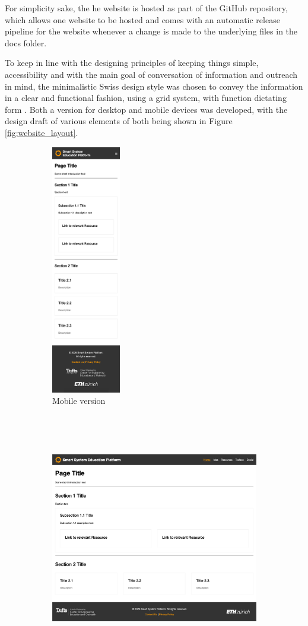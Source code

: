 For simplicity sake, the he website is hosted as part of the GitHub repository, which allows one website to be hosted and comes with an automatic release pipeline for the website whenever a change is made to the underlying files in the docs folder.

To keep in line with the designing principles of keeping things simple, accessibility and with the main goal of conversation of information and outreach in mind, the minimalistic Swiss design style was chosen to convey the information in a clear and functional fashion, using a grid system, with function dictating form \citep{muller-brockmann_grid_2020, hollis_swiss_2006}. Both a version for desktop and mobile devices was developed, with the design draft of various elements of both being shown in Figure \ref{fig:website_layout}.

\begin{figure}[H]
    \centering
    \begin{subfigure}{.18\textwidth}
        \includegraphics[height=310pt]{overleaf/images/website_mobile.png}
        \caption{Mobile version}
    \end{subfigure}
    \begin{subfigure}{.81\textwidth}
        \includegraphics[height=310pt]{overleaf/images/website_desktop.png}

\end{subfigure}
\end{figure}
